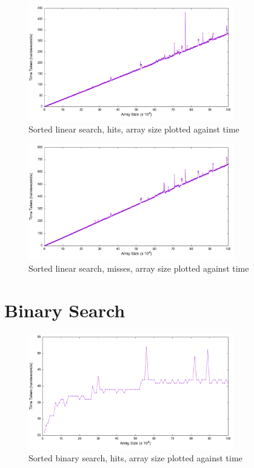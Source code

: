 \documentclass[a4paper,11pt]{article}
\begin{document}
\begin{figure}[h!]
  \centering
  \includegraphics[width=0.8\textwidth]{sorted_search_hit_linear_plot}
  \caption{Sorted linear search, hits, array size plotted against time}
  \label{fig:sorted_search_hit_linear_plot}
\end{figure}

\begin{figure}[h!]
  \centering
  \includegraphics[width=0.8\textwidth]{sorted_search_miss_linear_plot}
  \caption{Sorted linear search, misses, array size plotted against time}
  \label{fig:sorted_search_miss_linear_plot}
\end{figure}

\section*{Binary Search}



\begin{figure}[h!]
  \centering
  \includegraphics[width=0.8\textwidth]{sorted_search_hit_plot}
  \caption{Sorted binary search, hits, array size plotted against time}
  \label{fig:sorted_search_hit_plot}
\end{figure}
\end{document}
